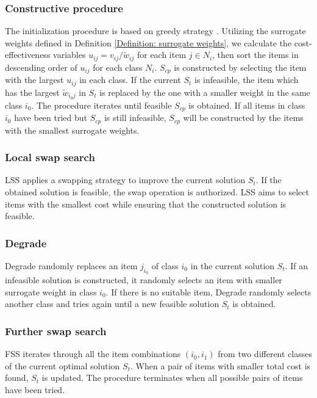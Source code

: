 \documentclass[lettersize,journal]{IEEEtran}
\begin{document}
\subsubsection{Constructive procedure}
The initialization procedure is based on greedy strategy \cite{kellerer2004multiple}.
Utilizing the surrogate weights defined in Definition \ref{Definition: surrogate weights}, we calculate the cost-effectiveness variables $u_{ij}=v_{ij}/\tilde{w}_{ij}$ for each item $j \in N_i$, then sort the items in descending order of $u_{ij}$ for each class $N_i$. 
$S_{cp}$ is constructed by selecting the item with the largest $u_{ij}$ in each class. 
If the current $S_{t}$ is infeasible,  the item which has the largest $\tilde{w}_{i_0j}$ in $S_t$ is replaced by the one with a smaller weight in the same class $i_0$. 
The procedure iterates until feasible $S_{cp}$ is obtained.
If all items in class $i_0$ have been tried but $S_{cp}$ is still infeasible, $S_{cp}$ will be constructed by the items with the smallest surrogate weights.

\subsubsection{Local swap search}
LSS applies a swapping strategy to improve the current solution $S_t$. 
If the obtained solution is feasible, the swap operation is authorized. 
LSS aims to select items with the smallest cost while ensuring that the constructed solution is feasible.

\subsubsection{Degrade}
Degrade randomly replaces an item $j_{i_0}$ of class $i_0$ in the current solution $S_t$. 
If an infeasible solution is constructed, it randomly selects an item with smaller surrogate weight in class $i_0$. 
If there is no suitable item, Degrade randomly selects another class and tries again until a new feasible solution $S_t$ is obtained.

\subsubsection{Further swap search}
FSS iterates through all the item combinations $(i_0,i_1)$ from two different classes of the current optimal solution $S_t$. 
When a pair of items with smaller total cost is found, $S_t$ is updated. 
The procedure terminates when all possible pairs of items have been tried.
\end{document}

